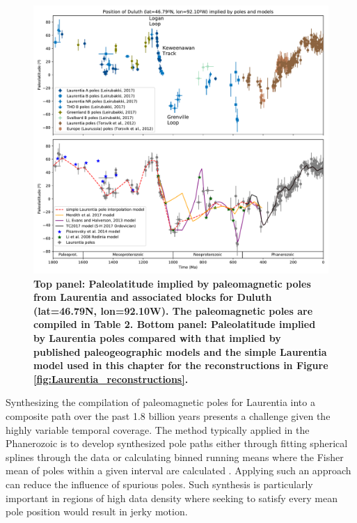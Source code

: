 \documentclass[11pt,letterpaper]{article}
\begin{document}
\begin{figure}
\centering
\includegraphics[width=\textwidth]{../Figures/Laurentia_paleolatitude.pdf}
\caption{\small{\textbf{Top panel: Paleolatitude implied by paleomagnetic poles from Laurentia and associated blocks for Duluth (lat=46.79\textdegree N, lon=92.10\textdegree W). The paleomagnetic poles are compiled in Table 2. Bottom panel: Paleolatitude implied by Laurentia poles compared with that implied by published paleogeographic models and the simple Laurentia model used in this chapter for the reconstructions in Figure \ref{fig:Laurentia_reconstructions}.}}}
\label{fig:Laurentia_paleolatitude}
\end{figure}

Synthesizing the compilation of paleomagnetic poles for Laurentia into a composite path over the past 1.8 billion years presents a challenge given the highly variable temporal coverage. The method typically applied in the Phanerozoic is to develop synthesized pole paths either through fitting spherical splines through the data or calculating binned running means where the Fisher mean of poles within a given interval are calculated \citep{Torsvik2012a}. Applying such an approach can reduce the influence of spurious poles. Such synthesis is particularly important in regions of high data density where seeking to satisfy every mean pole position would result in jerky motion.
\end{document}
